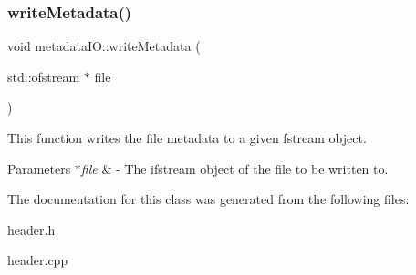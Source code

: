 \subsubsection{\texorpdfstring{write\+Metadata()}{writeMetadata()}}
{\footnotesize\ttfamily void metadata\+I\+O\+::write\+Metadata (\begin{DoxyParamCaption}\item[{std\+::ofstream $\ast$}]{file }\end{DoxyParamCaption})}

This function writes the file metadata to a given fstream object. 
\begin{DoxyParams}{Parameters}
{\em $\ast$file} & -\/ The ifstream object of the file to be written to. \\
\hline
\end{DoxyParams}


The documentation for this class was generated from the following files\+:\begin{DoxyCompactItemize}
\item 
header.\+h\item 
header.\+cpp\end{DoxyCompactItemize}
